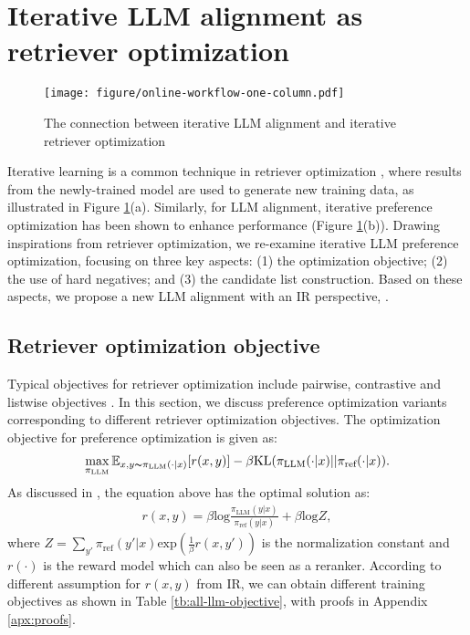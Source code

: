 
\section{Iterative LLM alignment as retriever optimization}\label{sec:proposal}

\begin{figure}[h!]
\centering
\texttt{[image: figure/online-workflow-one-column.pdf]}
\caption{The connection between iterative LLM alignment \citep{xiong2024iterative} and iterative retriever optimization \citep{xiong2020approximate}}\label{fig:llm-online}
\end{figure}

Iterative learning is a common technique in retriever optimization \citep{xiong2020approximate}, where results from the newly-trained model are used to generate new training data, as illustrated in Figure \ref{fig:llm-online}(a). 
Similarly, for LLM alignment, iterative preference optimization has been shown to enhance performance \citep{xiong2024iterative, xu2024bpo, guo2024direct} (Figure \ref{fig:llm-online}(b)). 
Drawing inspirations from retriever optimization, we re-examine iterative LLM preference optimization, focusing on three key aspects: 
(1) the optimization objective; 
(2) the use of hard negatives; and
(3) the candidate list construction.
Based on these aspects, we propose a new LLM alignment with an IR perspective, \Ours.



\subsection{Retriever optimization objective}\label{sec:retrieval-obj}
Typical objectives for retriever optimization include pairwise, contrastive and listwise objectives \citep{zhao2024dense}.
In this section, we discuss preference optimization variants \citep{wang2023aligning} corresponding to different retriever optimization objectives.
The optimization objective for preference optimization is given as:
\begin{gather*}
    \max_{\pi_{\text{LLM}}} \mathbb{E}_{x, y \thicksim\pi_{\text{LLM}}(\cdot|x)}[r(x,y)] - \beta \text{KL}(\pi_{\text{LLM}}(\cdot|x) || \pi_{\text{ref}}(\cdot|x)).
\end{gather*}
As discussed in \citep{rafailov2024direct}, the equation above has the optimal solution as:
\begin{gather}
    r(x, y) = \beta \text{log} \frac{\pi_{\text{LLM}}(y|x)}{\pi_{\text{ref}}(y|x)} + \beta \text{log} Z,
\end{gather}
where $Z=\sum_{y'} \pi_{\text{ref}}(y'|x) \text{exp}(\frac{1}{\beta} r(x, y'))$ is the normalization constant and $r(\cdot)$ is the reward model which can also be seen as a reranker.
According to different assumption for $r(x, y)$ from IR, we can obtain different training objectives as shown in Table \ref{tb:all-llm-objective}, with proofs in Appendix \ref{apx:proofs}.

